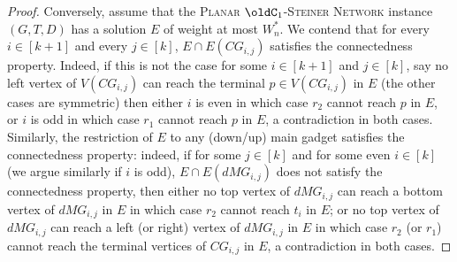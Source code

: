 \begin{proof}
Conversely, assume that the \textsc{Planar $\oldC_1$-Steiner Network} instance $(G,T,D)$ has a solution $E$ of weight at most $W_n^*$. We contend that for every $i \in [k+1]$ and every $j \in [k]$, $E \cap E(CG_{i,j})$ satisfies the connectedness property. Indeed, if this is not the case for some $i \in [k+1]$ and $j\in [k]$, say no left vertex of $V(CG_{i,j})$ can reach the terminal $p \in V(CG_{i,j})$ in $E$ (the other cases are symmetric) then either $i$ is even in which case $r_2$ cannot reach $p$ in $E$, or $i$ is odd in which case $r_1$ cannot reach $p$ in $E$, a contradiction in both cases. Similarly, the restriction of $E$ to any (down/up) main gadget satisfies the connectedness property: indeed, if for some $j \in [k]$ and for some even $i \in [k]$ (we argue similarly if $i$ is odd), $E \cap E(dMG_{i,j})$ does not satisfy the connectedness property, then either no top vertex of $dMG_{i,j}$ can reach a bottom vertex of $dMG_{i,j}$ in $E$ in which case $r_2$ cannot reach $t_i$ in $E$; or no top vertex of $dMG_{i,j}$ can reach a left (or right) vertex of $dMG_{i,j}$ in $E$ in which case $r_2$ (or $r_1$) cannot reach the terminal vertices of $CG_{i,j}$ in $E$, a contradiction in both cases.


\end{proof}

